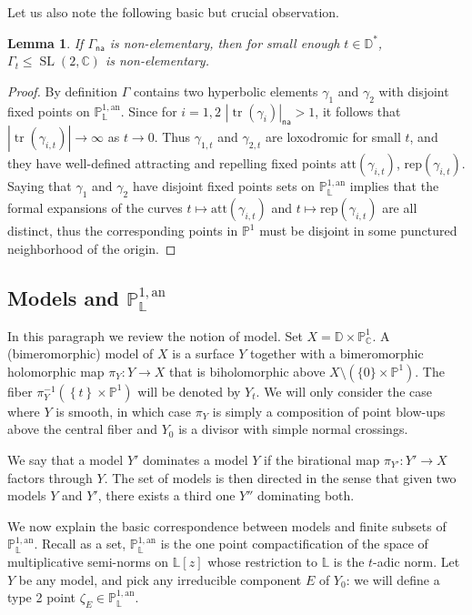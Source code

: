 \documentclass[11pt]{article}
\newtheorem{lemm}[theo]{Lemma}
\theoremstyle{definition}
\numberwithin{equation}{section}
\numberwithin{figure}{section}
\numberwithin{table}{section}
\DeclareMathOperator{\tr}{tr}
\DeclareMathOperator{\SL}{SL}
\newcommand{\cc}{\mathbb{C}}
\newcommand{\dD}{\mathbb{D}}
\newcommand{\an}{\mathrm{an}}
\newcommand{\cv}{\rightarrow}
\newcommand{\set}[1]{\left\{#1\right\}}
\newcommand{\abs}[1]{\left\vert#1\right\vert}
\newcommand{\pu}{{\mathbb{P}^1}}
\newcommand{\PP}{\mathbb{P}}
\newcommand{\berkl}{\mathbb P^{1,\an}_{\Laurent}}
\newcommand{\Laurent}{\mathbb{L}}
\newcommand{\att}{\mathrm{att}}
\newcommand{\rep}{\mathrm{rep}}
\newcommand{\na}{\mathsf{na}}
\newcommand{\SLC}{\SL(2,\mathbb C)}
\newcommand{\inv}{^{-1}}
\begin{document}
Let us also note the following basic but crucial observation.

\begin{lemm}\label{lem:specialization NE}
If $\Gamma_\na$ is non-elementary, then for small enough $t\in \dD^*$, $\Gamma_t\leq \SLC$ is non-elementary.
\end{lemm}

\begin{proof}
By definition $\Gamma$ contains two hyperbolic elements $\gamma_1$ and $\gamma_2$ with disjoint fixed points on $\PP^{1,\an}_{\Laurent}$. Since for $i=1,2$ $\abs{\tr (\gamma_i)}_\na>1$, it follows that $\abs{\tr(\gamma_{i,t})} \to \infty$ as $t\cv 0$. Thus $\gamma_{1,t}$ and $\gamma_{2,t}$ are loxodromic for small $t$, and they have well-defined attracting and repelling fixed points $\att(\gamma_{i,t})$, $\rep(\gamma_{i,t})$. Saying that $\gamma_1$ and $\gamma_2$ have disjoint fixed points sets on $\berkl$ implies that the formal expansions of the curves $t\mapsto \att(\gamma_{i,t})$ and $t\mapsto \rep(\gamma_{i,t})$ are all distinct, thus the corresponding points in $\pu$ must be disjoint in some punctured neighborhood of the origin.
\end{proof}

\subsection{Models and \texorpdfstring{$\PP^{1,\an}_{\Laurent}$}{PP1, an Laurent}} \label{subs:models}

In this paragraph we review the notion of model. Set $X = \dD\times \PP^1_\cc$. A (bimeromorphic) model of $X$ is a surface $Y$ together with a bimeromorphic holomorphic map $\pi_Y:Y\to X$ that is biholomorphic above $X\setminus (\{0\}\times \pu)$. The fiber $\pi_Y\inv(\set{t}\times \pu)$ will be denoted by $Y_t$. We will only consider the case where $Y$ is smooth, in which case $\pi_Y$ is simply a composition of point blow-ups above the central fiber and $Y_0$ is a divisor with simple normal crossings.

We say that a model $Y'$ dominates a model $Y$ if the birational map $\pi_{Y'}:Y'\cv X$ factors through $Y$. The set of models is then directed in the sense that given two models $Y$ and $Y'$, there exists a third one $Y''$ dominating both.

We now explain the basic correspondence between models and finite subsets of $\berkl$. Recall as a set, $\PP^{1,\an}_{\Laurent}$ is the one point compactification of the space of multiplicative semi-norms on $\Laurent[z]$ whose restriction to $\Laurent$ is the $t$-adic norm. Let $Y$ be any model, and pick any irreducible component $E$ of $Y_0$: we will define a type 2 point $\zeta_E \in \PP^{1,\an}_{\Laurent}$.
\end{document}
